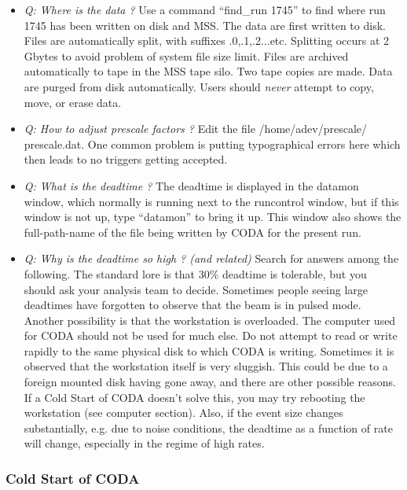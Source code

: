 \begin{itemize} 
\item{ {\it Q: Where is the data ?} \hskip 0.05in  
Use a command ``find\_run 1745'' to find
where run 1745 has been written on disk and MSS.  
The data are first written to disk.  Files are 
automatically split, with suffixes .0,.1,.2...etc.
Splitting occurs at 2 Gbytes to avoid problem
of system file size limit.  Files are
archived automatically to tape in the MSS
tape silo.  Two tape copies are made.  Data are
purged from disk automatically.  Users should
{\it never} attempt to copy, move, or erase data.}

\item{ {\it Q: How to adjust prescale factors ? } 
\hskip 0.05in
Edit the file /home/adev/prescale/ prescale.dat.
One common problem is putting typographical
errors here which then leads to no triggers
getting accepted.}

\item{ {\it Q: What is the deadtime ? } \hskip 0.05in
The deadtime is displayed in the datamon
window, which normally is running next to the 
runcontrol window, but if this window is
not up, type ``datamon'' to bring it up.
This window also shows the full-path-name of the file
being written by CODA for the present run.}

\item{ {\it Q: Why is the deadtime so high ?  
(and related)} \hskip 0.1in
Search for answers among the following.
The standard lore is that 30\% deadtime is tolerable,
but you should ask your analysis team to decide.
Sometimes people seeing large deadtimes
have forgotten to observe that the beam is in
pulsed mode.  Another possibility is that the
workstation is overloaded.  The computer used
for CODA should not be used for much else.
Do not attempt to read or write rapidly to the
same physical disk to which CODA is writing.
Sometimes it is observed that the workstation
itself is very sluggish.  
This could be due to a foreign
mounted disk having gone away, and there are
other possible reasons.  If a Cold Start of CODA
doesn't solve this, you may 
try rebooting the workstation
(see computer section).  Also, if
the event size changes substantially, e.g. due
to noise conditions, the deadtime as a function
of rate will change, especially 
in the regime of high rates.}


\end{itemize}

\subsubsection{ Cold Start of CODA}

